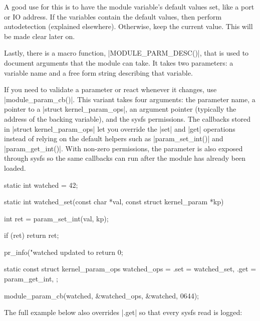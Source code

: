 \documentclass[10pt, oneside]{book}
\begin{document}
A good use for this is to have the module variable's default values set, like a port or IO address.
If the variables contain the default values, then perform autodetection (explained elsewhere).
Otherwise, keep the current value.
This will be made clear later on.

Lastly, there is a macro function, \cpp|MODULE_PARM_DESC()|, that is used to document arguments that the module can take.
It takes two parameters: a variable name and a free form string describing that variable.


If you need to validate a parameter or react whenever it changes, use \cpp|module_param_cb()|.
This variant takes four arguments: the parameter name, a pointer to a \cpp|struct kernel_param_ops|,
an argument pointer (typically the address of the backing variable), and the sysfs permissions.
The callbacks stored in \cpp|struct kernel_param_ops| let you override the \cpp|set| and \cpp|get|
operations instead of relying on the default helpers such as \cpp|param_set_int()| and \cpp|param_get_int()|.
With non-zero permissions, the parameter is also exposed through sysfs so the same callbacks can run after the module has already been loaded.

\begin{code}
static int watched = 42;

static int watched_set(const char *val, const struct kernel_param *kp)
{
    int ret = param_set_int(val, kp);

    if (ret)
        return ret;

    pr_info("watched updated to %
    return 0;
}

static const struct kernel_param_ops watched_ops = {
    .set = watched_set,
    .get = param_get_int,
};

module_param_cb(watched, &watched_ops, &watched, 0644);
\end{code}

The full example below also overrides \cpp|.get| so that every sysfs read is logged:
\end{document}
